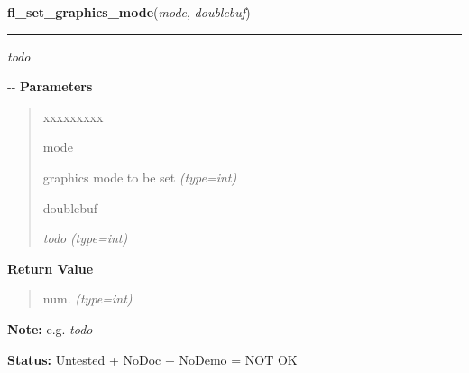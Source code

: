 \hspace{.8\funcindent}\begin{boxedminipage}{\funcwidth}

    \raggedright \textbf{fl\_set\_graphics\_mode}(\textit{mode}, \textit{doublebuf})

    \vspace{-1.5ex}

    \rule{\textwidth}{0.5\fboxrule}
\setlength{\parskip}{2ex}

\emph{todo}

-{}-
\setlength{\parskip}{1ex}
      \textbf{Parameters}
      \vspace{-1ex}

      \begin{quote}
        \begin{Ventry}{xxxxxxxxx}

          \item[mode]


graphics mode to be set
            {\it (type=int)}

          \item[doublebuf]


\emph{todo}
            {\it (type=int)}

        \end{Ventry}

      \end{quote}

      \textbf{Return Value}
    \vspace{-1ex}

      \begin{quote}

num.
      {\it (type=int)}

      \end{quote}

\textbf{Note:} 
e.g. \emph{todo}


\textbf{Status:} 
Untested + NoDoc + NoDemo = NOT OK


    \end{boxedminipage}

    \label{xformslib:flxbasic:fl_set_visualID}

    \vspace{0.5ex}

